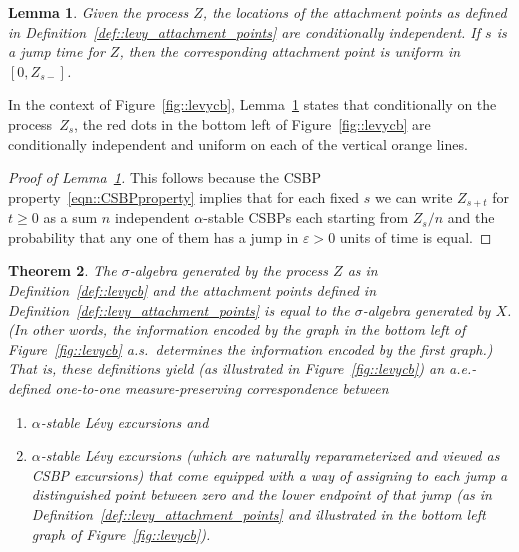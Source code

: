\documentclass[10pt]{amsart}
\let\epsilon\varepsilon
\theoremstyle{plain}
\newtheorem{theorem}{Theorem}
\numberwithin{theorem}{section}
\newtheorem{lemma}[theorem]{Lemma}
\theoremstyle{definition}
\begin{document}
\begin{lemma}
\label{lem::bubble_locations_independent}
Given the process $Z$, the locations of the attachment points as defined in Definition~\ref{def::levy_attachment_points} are conditionally independent. If $s$ is a jump time for $Z$, then the corresponding attachment point is uniform in $[0,Z_{s-}]$.
\end{lemma}
In the context of Figure~\ref{fig::levycb}, Lemma~\ref{lem::bubble_locations_independent} states that conditionally on the process~$Z_s$, the red dots in the bottom left of Figure~\ref{fig::levycb} are conditionally independent and uniform on each of the vertical orange lines.
\begin{proof}[Proof of Lemma~\ref{lem::bubble_locations_independent}]
This follows because the CSBP property~\eqref{eqn::CSBPproperty} implies that for each fixed $s$ we can write $Z_{s+t}$ for $t \geq 0$ as a sum $n$ independent $\alpha$-stable CSBPs each starting from $Z_s/n$ and the probability that any one of them has a jump in $\epsilon > 0$ units of time is equal.
\end{proof}

\begin{theorem}
\label{thm::levynetrecover}
The $\sigma$-algebra generated by the process $Z$ as in Definition~\ref{def::levycb} and the attachment points defined in Definition~\ref{def::levy_attachment_points} is equal to the $\sigma$-algebra generated by $X$. (In other words, the information encoded by the graph in the bottom left of Figure~\ref{fig::levycb} a.s.\ determines the information encoded by the first graph.) That is, these definitions yield (as illustrated in Figure~\ref{fig::levycb}) an a.e.-defined one-to-one measure-preserving correspondence between
\begin{enumerate}
\item $\alpha$-stable Lévy excursions and
\item $\alpha$-stable Lévy excursions (which are naturally reparameterized and viewed as CSBP excursions) that come equipped with a way of assigning to each jump a distinguished point between zero and the lower endpoint of that jump (as in Definition~\ref{def::levy_attachment_points} and illustrated in the bottom left graph of Figure~\ref{fig::levycb}).
\end{enumerate}
\end{theorem}
\end{document}
